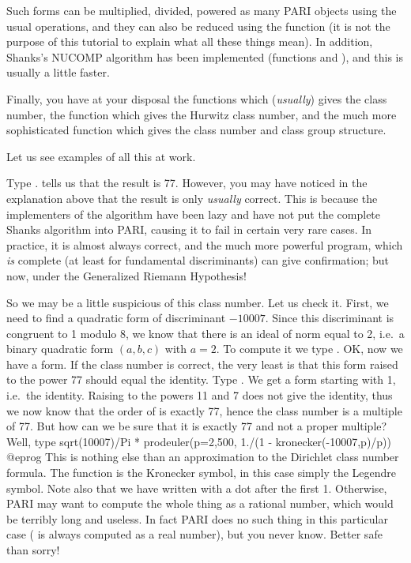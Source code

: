 Such forms can be multiplied, divided, powered as many PARI objects using
the usual operations, and they can also be reduced using the function
 (it is not the purpose of this tutorial to explain what all
these things mean). In addition, Shanks's NUCOMP algorithm has been
implemented (functions  and ), and this is
usually a little faster.

Finally, you have at your disposal the functions  which
(\emph{usually}) gives the class number, the function 
which gives the Hurwitz class number, and the much more sophisticated
 function which gives the class number and class group
structure.

Let us see examples of all this at work.

Type .  tells us that the result is 77. However,
you may have noticed in the explanation above that the result is only
\emph{usually} correct. This is because the implementers of the algorithm
have been lazy and have not put the complete Shanks algorithm into PARI,
causing it to fail in certain very rare cases. In practice, it is almost
always correct, and the much more powerful  program, which
\emph{is} complete (at least for fundamental discriminants) can give
confirmation; but now, under the Generalized Riemann Hypothesis!

So we may be a little suspicious of this class number. Let us check it.
First, we need to find a quadratic form of discriminant $-10007$. Since this
discriminant is congruent to 1 modulo 8, we know that there is an ideal of
norm equal to 2, i.e.~a binary quadratic form $(a,b,c)$ with $a=2$. To
compute it we type . OK, now we have a form.
If the class number is correct, the very least is that this form raised to
the power 77 should equal the identity. Type . We get a form
starting with 1, i.e.~the identity. Raising  to the powers 11 and 7
does not give the identity, thus we now know that the order of  is
exactly 77, hence the class number is a multiple of 77. But how can we be
sure that it is exactly 77 and not a proper multiple? Well, type
\bprog
  sqrt(10007)/Pi * prodeuler(p=2,500, 1./(1 - kronecker(-10007,p)/p))
@eprog\noindent
This is nothing else than an approximation to the Dirichlet class number
formula. The function  is the Kronecker symbol, in this case
simply the Legendre symbol. Note also that we have written 
with a dot after the first 1. Otherwise, PARI may want to compute the whole
thing as a rational number, which would be terribly long and useless. In fact
PARI does no such thing in this particular case ( is always
computed as a real number), but you never know. Better safe than sorry!

